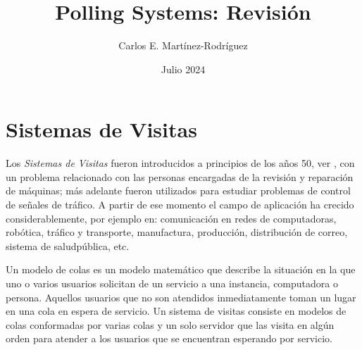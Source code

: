 \documentclass{article}
\title{Polling Systems: Revisi\'on}
\author{Carlos E. Martínez-Rodríguez}
\date{Julio 2024}
\begin{document}
\maketitle

\tableofcontents

\section{Sistemas de Visitas}
Los {\emph{Sistemas de Visitas}} fueron introducidos a principios de los a\~nos 50, ver \cite{Boxma,BoonMeiWinands,LevySidi,TesisRoubos,Takagi,Semenova}, con un problema relacionado con las personas encargadas de la revisi\'on y reparaci\'on de m\'aquinas; m\'as adelante fueron utilizados para estudiar problemas de control de se\~nales de tr\'afico. A partir de ese momento el campo de aplicaci\'on ha crecido considerablemente, por ejemplo en: comunicaci\'on en redes de computadoras, rob\'otica, tr\'afico y transporte, manufactura, producci\'on, distribuci\'on de correo, sistema de saludp\'ublica, etc.

Un modelo de colas es un modelo matem\'atico que describe la situaci\'on en la que uno o varios usuarios solicitan de un servicio a una instancia, computadora o persona. Aquellos usuarios que no son atendidos inmediatamente toman un lugar en una cola en espera de servicio. Un sistema de visitas consiste en modelos de colas conformadas por varias colas y un solo servidor que las visita en alg\'un orden para atender a los usuarios que se encuentran esperando por servicio.

\end{document}
